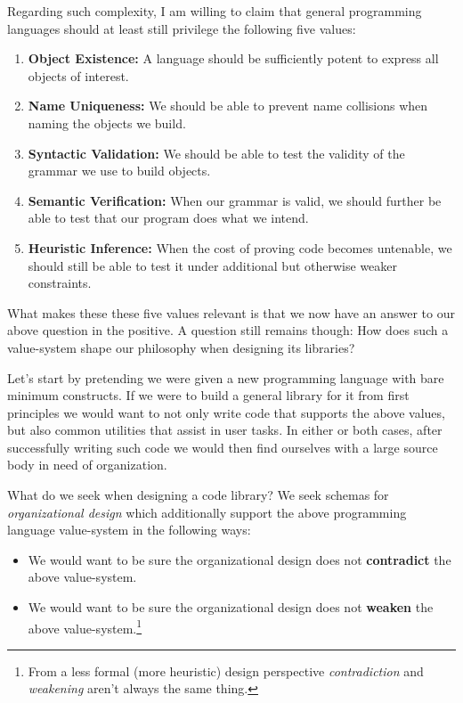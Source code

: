 \documentclass[twoside]{article}
\newcommand{\strong}[1]{{\bfseries #1}}
\begin{document}
Regarding such complexity, I am willing to claim that general programming languages should at least still privilege
the following five values:

\begin{enumerate}
\item \strong{Object Existence:} A language should be sufficiently potent to express all objects of interest.
\item \strong{Name Uniqueness:} We should be able to prevent name collisions when naming the objects we build.
\item \strong{Syntactic Validation:} We should be able to test the validity of the grammar we use to build objects.
\item \strong{Semantic Verification:} When our grammar is valid, we should further be able to test that our program
      does what we intend.
\item \strong{Heuristic Inference:} When the cost of proving code becomes untenable, we should still be able to test
      it under additional but otherwise weaker constraints.
\end{enumerate}

What makes these these five values relevant is that we now have an answer to our above question in the positive.
A question still remains though: How does such a value-system shape our philosophy when designing its libraries?

Let's start by pretending we were given a new programming language with bare minimum constructs. If we were to build a general
library for it from first principles we would want to not only write code that supports the above values, but also common
utilities that assist in user tasks. In either or both cases, after successfully writing such code we would then find
ourselves with a large source body in need of organization.

What do we seek when designing a code library? We seek schemas for \emph{organizational design} which additionally support
the above programming language value-system in the following ways:

\begin{itemize}
\item We would want to be sure the organizational design does not \strong{contradict} the above value-system.
\item We would want to be sure the organizational design does not \strong{weaken} the above value-system.\footnote{From
      a less formal (more heuristic) design perspective \emph{contradiction} and \emph{weakening} aren't always the same thing.}
\end{itemize}
\end{document}
